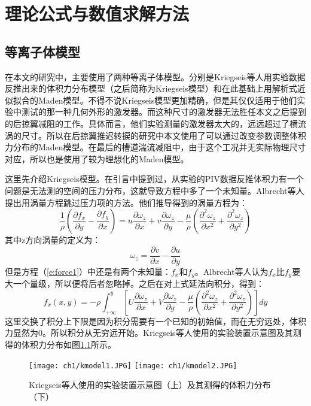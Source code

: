 \chapter{理论公式与数值求解方法}
\label{cha:2}
\section{等离子体模型}
在本文的研究中，主要使用了两种等离子体模型。分别是Kriegseis等人\cite{kriegseis2013velocity}用实验数据反推出来的体积力分布模型（之后简称为Kriegseis模型）和在此基础上用解析式近似拟合的Maden模型\cite{Maden2013}。不得不说Kriegseis模型更加精确，但是其仅仅适用于他们实验中测试的那一种几何外形的激发器。而这种尺寸的激发器无法胜任本文之后提到的后掠翼减阻的工作。具体而言，他们实验测量的激发器太大的，远远超过了横流涡的尺寸。所以在后掠翼推迟转捩的研究中本文使用了可以通过改变参数调整体积力分布的Maden模型。在最后的槽道湍流减阻中，由于这个工况并无实际物理尺寸对应，所以也是使用了较为理想化的Maden模型。

这里先介绍Kriegseis模型。在引言中提到过，从实验的PIV数据反推体积力有一个问题是无法测的空间的压力分布，这就导致方程中多了一个未知量。Albrecht等人\cite{albrecht2011method}提出用涡量方程跳过压力项的方法。他们推导得到的涡量方程为：
\begin{equation}\label{e:force1}
\frac{1}{\rho} \left( \frac{\partial f_x}{\partial y}-\frac{\partial f_y}{\partial x} \right)=  {u\frac{{\partial \omega_z }}
{{\partial x}} + v\frac{{\partial \omega_z }}
{{\partial y}} - \frac{\mu }
{\rho }\left( {\frac{{\partial ^2 \omega_z }}
{{\partial x^2 }} + \frac{{\partial ^2 \omega_z }}
{{\partial y^2 }}} \right)}
\end{equation}
其中z方向涡量的定义为：
\begin{equation}\label{e:vorticity}
  \omega_z=\frac{\partial v}{\partial x}-\frac{\partial u}{\partial y}
\end{equation}
但是方程（\ref{e:force1}）中还是有两个未知量：$f_x$和$f_y$。Albrecht等人\cite{albrecht2011method}认为$f_x$比$f_y$要大一个量级，所以便将后者忽略掉。之后在对上式延法向积分，得到：
\begin{equation}\label{e:force3}
f_x(x,y) =  - \rho \int_{+\infty} ^y {\left[ {U\frac{{\partial \omega_z }}
{{\partial x}} + V\frac{{\partial \omega_z }}
{{\partial y}} - \frac{\mu }
{\rho }\left( {\frac{{\partial ^2 \omega_z }}
{{\partial x^2 }} + \frac{{\partial ^2 \omega_z }}
{{\partial y^2 }}} \right)} \right]dy}
\end{equation}
这里交换了积分上下限是因为积分需要有一个已知的初始值，而在无穷远处，体积力显然为0。所以积分从无穷远开始。Kriegseis等人\cite{kriegseis2013velocity}使用的实验装置示意图及其测得的体积力分布如图\ref{f:kmodel}所示。
\begin{figure}
  \centering
  \texttt{[image: ch1/kmodel1.JPG]}
  \texttt{[image: ch1/kmodel2.JPG]}
  \caption{Kriegseis等人\cite{kriegseis2013velocity}使用的实验装置示意图（上）及其测得的体积力分布（下）}\label{f:kmodel}
\end{figure}

